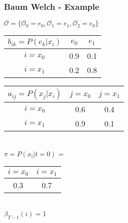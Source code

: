 \begin{frame}
	\frametitle{Baum Welch - Example}
  \begin{table}
  \centering
  $\mathcal{O} = \{\mathcal{O}_0 = e_0, \mathcal{O}_1 = e_1, \mathcal{O}_2 = e_0\}$\\
  \begin{tabular}{| c | c | c |}
  	\hline
    $b_{ik} = P(e_k|x_i)$ & $e_0$ & $e_1$ \\ \hline
    $i = x_0$                 & 0.9   & 0.1   \\ \hline
    $i = x_1$                 & 0.2   & 0.8   \\ \hline
  \end{tabular}
  \begin{tabular}{| c | c | c |}
  	\hline
    $a_{ij} = P(x_j|x_i)$ & $j = x_0$ & $j = x_1$ \\ \hline
    $i = x_0$                 & 0.6   & 0.4   \\ \hline
    $i = x_1$                 & 0.9   & 0.1   \\ \hline
  \end{tabular}
  \\$\pi = P(x_i|t=0)$ =
  \begin{tabular}{| c | c |}
  	\hline
    $i = x_0$ & $i = x_1$ \\ \hline
    0.3   & 0.7   \\ \hline
  \end{tabular}\\
  $\beta_{T-1}(i) = 1$
\end{table}
\end{frame}


